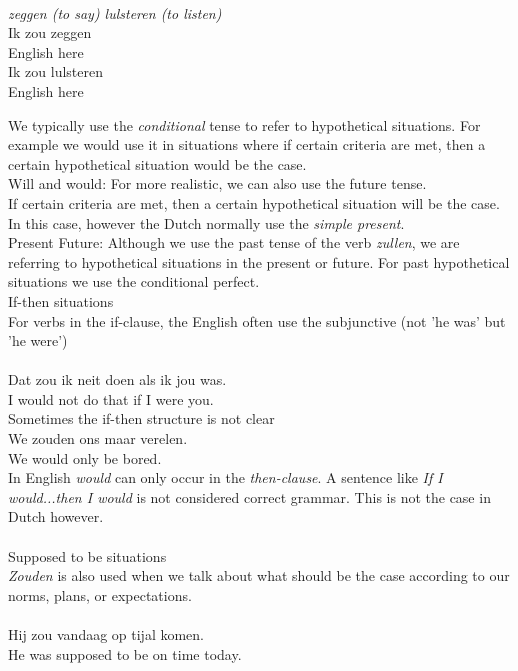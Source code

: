 \documentclass[letterpaper,11pt]{article}
\begin{document}
\\
 \textit{zeggen (to say) lulsteren (to listen)} \\
Ik zou zeggen \\ %
English here \\
Ik zou lulsteren \\
English here \\
\par{We typically use the \textit{conditional} tense to refer to hypothetical
situations. For example we would use it in situations where if certain criteria
are met, then a certain hypothetical situation would be the case.}
\\
Will and would: For more realistic, we can also use the future tense. \\
If certain criteria are met, then a certain hypothetical situation will be the
case. In this case, however the Dutch normally use the \textit{simple present}.
\\
Present Future: Although we use the past tense of the verb \textit{zullen}, we
are referring to hypothetical situations in the present or future. For past
hypothetical situations we use the conditional perfect.  \\
If-then situations \\
For verbs in the if-clause, the English often use the subjunctive (not 'he was'
but 'he were') %
\\
 \\
Dat zou ik neit doen als ik jou was. \\
I would not do that if I were you. \\
Sometimes the if-then structure is not clear \\
We zouden ons maar verelen.\\
We would only be bored. \\ %
In English \textit{would} can only occur in the \textit{then-clause}. A sentence
like \textit{If I would...then I would} is not considered correct grammar. This
is not the case in Dutch however. \\ \\
Supposed to be situations \\
\textit{Zouden} is also used when we talk about what should be the case
according to our norms, plans, or expectations. \\
 \\
Hij zou vandaag op tijal komen. \\
He was supposed to be on time today. \\
\end{document}
